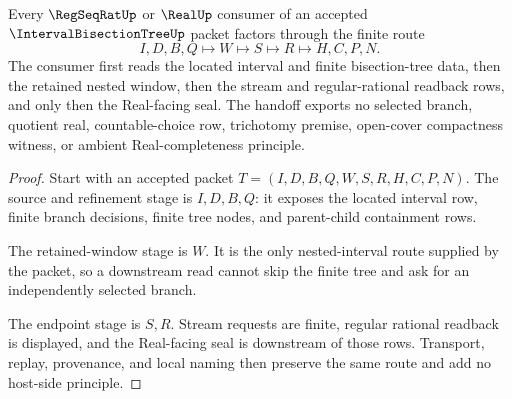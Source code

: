 \begin{theorem}
\label{thm:interval-bisection-tree-real-handoff}
Every $\RegSeqRatUp$ or $\RealUp$ consumer of an accepted $\IntervalBisectionTreeUp$ packet factors through the finite route
$$
I,D,B,Q \longmapsto W \longmapsto S \longmapsto R \longmapsto H,C,P,N .
$$
The consumer first reads the located interval and finite bisection-tree data, then the retained nested window, then the stream and regular-rational readback rows, and only then the Real-facing seal. The handoff exports no selected branch, quotient real, countable-choice row, trichotomy premise, open-cover compactness witness, or ambient Real-completeness principle.
\end{theorem}
\begin{proof}
Start with an accepted packet $T=(I,D,B,Q,W,S,R,H,C,P,N)$. The source and refinement stage is $I,D,B,Q$: it exposes the located interval row, finite branch decisions, finite tree nodes, and parent-child containment rows.

The retained-window stage is $W$. It is the only nested-interval route supplied by the packet, so a downstream read cannot skip the finite tree and ask for an independently selected branch.

The endpoint stage is $S,R$. Stream requests are finite, regular rational readback is displayed, and the Real-facing seal is downstream of those rows. Transport, replay, provenance, and local naming then preserve the same route and add no host-side principle.
\end{proof}




